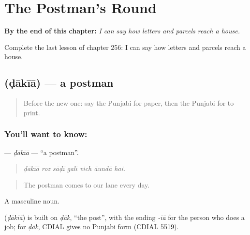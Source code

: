 
\chapter{The Postman's Round}
\label{ch:pa-a2-the-postman-s-round}

\begin{chapteropening}
\textbf{By the end of this chapter:} \emph{I can say how letters and parcels reach a house.}

Complete the last lesson of chapter 256: I can say how letters and parcels reach a house.
\end{chapteropening}

\section[\texorpdfstring{\pa{ਡਾਕੀਆ} (ḍākīā)}{ਡਾਕੀਆ (ḍākīā)}]{ (ḍākīā) — a postman}

\label{lesson:PA-C256-dakia}



\begin{quote}
Before the new one: say the Punjabi for paper, then the Punjabi for to print.
\end{quote}

\subsection*{You'll want to know: }
\textbf{} — \emph{ḍākīā} — \textquotedblleft{}a postman\textquotedblright{}.

\begin{quote}
      
\end{quote}

\begin{quote}
\emph{ḍākīā roz sāḍī galī vich āundā hai.}
\end{quote}

\begin{quote}
The postman comes to our lane every day.
\end{quote}

A masculine noun.

\begin{cousinweb}
\textbf{} (\emph{ḍākīā}) is built on \emph{ḍāk}, \textquotedblleft{}the post\textquotedblright{}, with the ending \emph{-īā} for the person who does a job; for \emph{ḍāk}, CDIAL gives no Punjabi form (CDIAL 5519).
\end{cousinweb}

